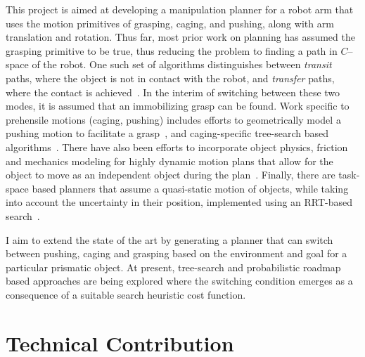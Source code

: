 \documentclass[runningheads,letterpaper]{llncs}
\begin{document}
This project is aimed at developing a manipulation planner for a robot arm that uses the motion primitives of grasping, caging, and pushing, along with arm translation and rotation. Thus far, most prior work on planning has assumed the grasping primitive to be true, thus reducing the problem to finding a path in $C$--space of the robot. One such set of algorithms distinguishes between \textit{transit} paths, where the object is not in contact with the robot, and \textit{transfer} paths, where the contact is achieved~\cite{alami1994two}. In the interim of switching between these two modes, it is assumed that an immobilizing grasp can be found. Work specific to prehensile motions (caging, pushing) includes efforts to geometrically model a pushing motion to facilitate a grasp~\cite{dogar2010push}, and caging-specific tree-search based algorithms~\cite{diankov2008manipulation}. There have also been efforts to incorporate object physics, friction and mechanics modeling for highly dynamic motion plans that allow for the object to move as an independent object during the plan~\cite{dogar2012physics}. Finally, there are task-space based planners that assume a quasi-static motion of objects, while taking into account the uncertainty in their position, implemented using an RRT-based search~\cite{berenson2009addressing}.

I aim to extend the state of the art by generating a planner that can switch between pushing, caging and grasping based on the environment and goal for a particular prismatic object. At present, tree-search and probabilistic roadmap~\cite{kavraki2016motion} based approaches are being explored where the switching condition emerges as a consequence of a suitable search heuristic cost function.


\section{Technical Contribution}
\end{document}
